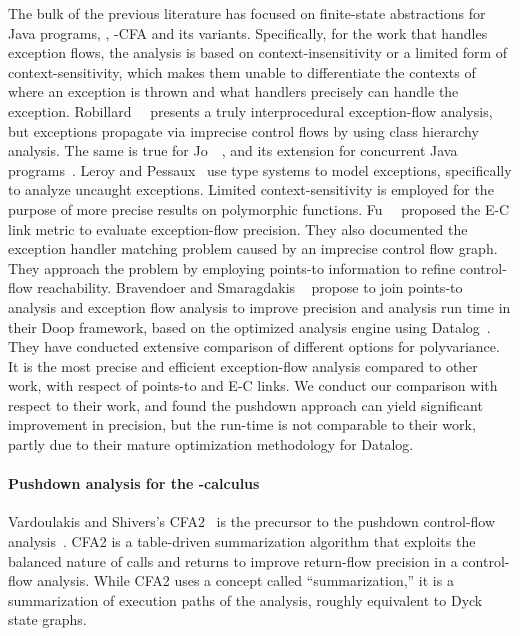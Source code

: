The bulk of the previous literature has focused on finite-state abstractions for Java programs, \ie,
-CFA and its variants.
Specifically, for the work that handles exception flows, the analysis is based on 
context-insensitivity or a limited form of context-sensitivity, which makes them unable to differentiate the contexts 
of where an exception is thrown  and what handlers precisely can handle the exception.
Robillard~\etal~\cite{Robillard:2003:evolution-exception} 
presents a truly interprocedural exception-flow analysis, but exceptions propagate
via imprecise control flows by using class hierarchy analysis.
The same is true for Jo~\etal{}~\cite{local:Jo:2002:UncaughtException},
and its extension for concurrent Java programs~\cite{Ryu:2001:MultiThreadExceptions}.
Leroy and Pessaux~\cite{Leroy:2004:TypeBasedUncaughtExceptions} use
type systems to model exceptions, specifically to analyze uncaught
exceptions. Limited context-sensitivity is employed for the purpose of
more precise results on polymorphic functions.
Fu~\etal{}~\cite{Fu:2005:rubust-java-server-apps} proposed the E-C link metric to evaluate 
 exception-flow precision. They also documented the exception handler matching problem caused 
 by an imprecise control flow graph. They approach the problem by employing  points-to information to refine
 control-flow reachability.
Bravendoer and Smaragdakis ~\cite{Bravenboer:2009:Exceptions}
 propose to join points-to analysis and exception flow analysis to improve 
 precision and analysis run time in their Doop framework, 
 based on the optimized analysis engine using Datalog~\cite{Bravebboer:2009:declare-pointsto}.
 They have conducted extensive comparison of different options for polyvariance.
 It is the most precise and efficient exception-flow analysis compared to other work, with respect of points-to 
and E-C links. We conduct our comparison with respect to their work, and found the 
pushdown approach can yield significant improvement in precision, but the run-time is not comparable 
to their work, partly due to their mature optimization methodology for Datalog.


\paragraph{\textbf{Pushdown analysis for the -calculus}}



Vardoulakis and Shivers's CFA2~\cite{mattmight:Vardoulakis:2010:CFA2}
is the precursor to the pushdown control-flow
analysis~\cite{local:Earl:2010:PDCFA}.
CFA2 is a table-driven summarization algorithm that exploits the
balanced nature of calls and returns to improve return-flow precision
in a control-flow analysis.
While CFA2 uses a concept called ``summarization,'' it is a
summarization of execution paths of the analysis, roughly equivalent
to Dyck state graphs.

